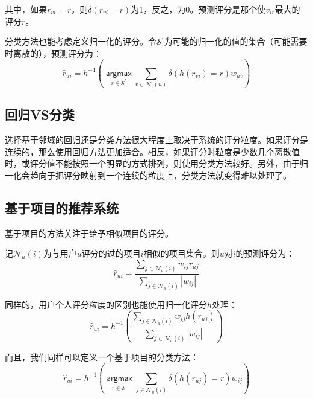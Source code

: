 \documentclass{article}
\begin{document}
 其中，如果$r_{vi}=r$，则$\delta(r_{vi}=r)$为1，反之，为0。预测评分是那个使$v_{ir}$最大的评分$r$。

 分类方法也能考虑定义归一化的评分。令$\mathcal{S}^{'}$为可能的归一化的值的集合（可能需要时离散的），预测评分为：
 $$ \hat{r}_{ui}=h^{-1}\left(\mathop{\mathsf{argmax}}\limits_{r\in\mathcal{S}^{'}}\mathop{\sum}\limits_{v\in\mathcal{N}_i(u)}\delta(h(r_{vi})=r)w_{uv}\right) $$

 \subsection{回归VS分类}
 选择基于邻域的回归还是分类方法很大程度上取决于系统的评分粒度。如果评分是连续的，那么使用回归方法更加适合。相反，如果评分时粒度是少数几个离散值时，或评分值不能按照一个明显的方式排列，则使用分类方法较好。另外，由于归一化会趋向于把评分映射到一个连续的粒度上，分类方法就变得难以处理了。

 \subsection{基于项目的推荐系统}
 基于项目的方法关注于给予相似项目的评分。

 记$\mathcal{N}_u(i)$为与用户$u$评分的过的项目$i$相似的项目集合。则$u$对$i$的预测评分为：
 $$ \hat{r}_{ui}=\frac{\mathop{\sum}\limits_{j\in\mathcal{N}_u(i)}w_{ij}r_{uj}}{\mathop{\sum}\limits_{j\in\mathcal{N}_u(i)}|w_{ij}|} $$

 同样的，用户个人评分粒度的区别也能使用归一化评分$h$处理：
 $$ \hat{r}_{ui}=h^{-1}\left(\frac{\mathop{\sum}\limits_{j\in\mathcal{N}_u(i)}w_{ij}h(r_{uj})}{\mathop{\sum}\limits_{j\in\mathcal{N}_u(i)}|w_{ij}|}\right) $$

 而且，我们同样可以定义一个基于项目的分类方法：
 $$ \hat{r}_{ui}=h^{-1}\left(\mathop{\mathsf{argmax}}\limits_{r\in\mathcal{S}^{'}}\mathop{\sum}\limits_{j\in\mathcal{N}_u(i)}\delta(h(r_{uj})=r)w_{ij}\right) $$
\end{document}
